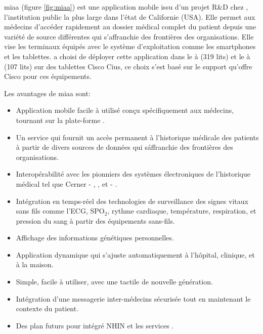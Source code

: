 \gls{miaa} (figure \ref{fig:miaa}) est une application mobile issu d'un
projet R\&D chez , l'institution public la
plus large dans l'état de Californie (USA). Elle permet aux médecins
d'accéder rapidement au dossier médical complet du patient depuis une
variété de source différentes qui s'affranchie des frontières des
organisations\cite{pph:eweek}. Elle vise les terminaux équipés avec le
système d'exploitation \android{} comme les smartphones et les
tablettes.  a choisi de déployer cette
application dans le  à  (319
lits) et le  à  (107 lits) sur des
tablettes Cisco Cius\cite{pph:tabtimes}, ce choix s'est basé sur le
support qu'offre Cisco pour ces équipements.

Les avantages de \gls{miaa} sont:~\cite{pph:yahoo}

\begin{itemize}

\item Application mobile facile à utilisé conçu spécifiquement aux
médecins, tournant sur la plate-forme \android{}.

\item Un service  qui fournit un accès permanent à
l'historique médicale des patients à partir de divers sources de
données qui s\'affranchie des frontières des organisations.

\item Interopérabilité avec les pionniers des systèmes électroniques
de l'historique médical tel que Cerner - ,
, et  - .

\item Intégration en temps-réel des technologies de surveillance
des signes vitaux sans fils comme l'ECG, SPO$_{2}$, rythme cardiaque,
température, respiration, et pression du sang à partir des équipements
sans-fils.

\item Affichage des informations génétiques personnelles.

\item Application dynamique qui s’ajuste automatiquement à l’hôpital, clinique, et à la maison.

\item Simple, facile à utiliser, avec une tactile de nouvelle génération.

\item Intégration d’une messagerie inter-médecins sécurisée tout en maintenant le contexte du patient.

\item Des plan futurs pour intégré NHIN  et les services
.

\end{itemize}

